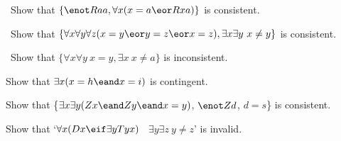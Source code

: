 \problempart
\label{pr.IdentityModels}
\begin{earg}
\item\leftsolutions\ Show that $\{{\enot}Raa, \forall x (x=a \eor Rxa)\}$
is consistent.
\item\leftsolutions\ Show that $\{\forall x\forall y\forall z(x=y \eor y=z \eor x=z),
\exists x\exists y\ x\neq y\}$ is consistent.
\item\leftsolutions\ Show that $\{\forall x\forall y\ x=y, \exists x\ x \neq a\}$ is inconsistent.
\item Show that $\exists x (x = h \eand x = i)$ is contingent.
\item Show that \{$\exists x\exists y(Zx \eand Zy \eand x=y)$, $\enot Zd$, $d=s$\} is consistent.
\item Show that `$\forall x(Dx \eif \exists y Tyx)$ \therefore\ $\exists y \exists z\ y\neq z$' is invalid.
\end{earg}
\problempart
\label{pr.IdentityModels}

